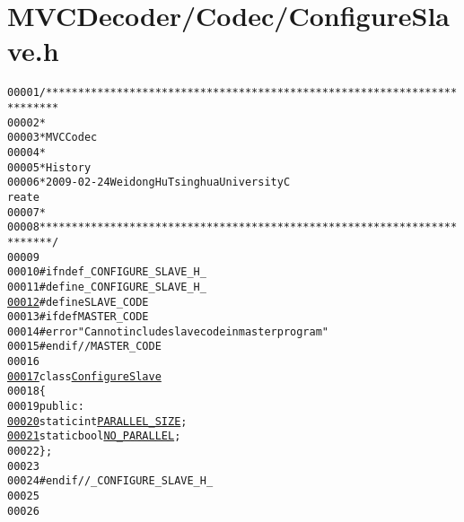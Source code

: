 \hypertarget{_configure_slave_8h_source}{
\section{MVCDecoder/Codec/ConfigureSlave.h}
}


\begin{footnotesize}\begin{alltt}
00001 \textcolor{comment}{/************************************************************************}
00002 \textcolor{comment}{ *}
00003 \textcolor{comment}{ * MVC Codec}
00004 \textcolor{comment}{ * }
00005 \textcolor{comment}{ * History}
00006 \textcolor{comment}{ * 2009-02-24           Weidong Hu              Tsinghua University             C
      reate}
00007 \textcolor{comment}{ * }
00008 \textcolor{comment}{ ************************************************************************/}
00009 
00010 \textcolor{preprocessor}{#ifndef \_CONFIGURE\_SLAVE\_H\_}
00011 \textcolor{preprocessor}{}\textcolor{preprocessor}{#define \_CONFIGURE\_SLAVE\_H\_}
\hypertarget{_configure_slave_8h_source_l00012}{}\hyperlink{_configure_slave_8h_a995f6a4907273b8d56b6543ab1a57d17}{00012} \textcolor{preprocessor}{}\textcolor{preprocessor}{#define SLAVE\_CODE}
00013 \textcolor{preprocessor}{}\textcolor{preprocessor}{#ifdef MASTER\_CODE}
00014 \textcolor{preprocessor}{}\textcolor{preprocessor}{#error "Can not include slave code in master program"}
00015 \textcolor{preprocessor}{}\textcolor{preprocessor}{#endif // MASTER\_CODE}
00016 \textcolor{preprocessor}{}
\hypertarget{_configure_slave_8h_source_l00017}{}\hyperlink{class_configure_slave}{00017} \textcolor{keyword}{class }\hyperlink{class_configure_slave}{ConfigureSlave}
00018 \{
00019 \textcolor{keyword}{public}:
\hypertarget{_configure_slave_8h_source_l00020}{}\hyperlink{class_configure_slave_aa79549b1785cff1588646653021641f2}{00020}         \textcolor{keyword}{static} \textcolor{keywordtype}{int} \hyperlink{class_configure_slave_aa79549b1785cff1588646653021641f2}{PARALLEL_SIZE};
\hypertarget{_configure_slave_8h_source_l00021}{}\hyperlink{class_configure_slave_a51c09eff937ca8da9bcc20e1367ddb3d}{00021}         \textcolor{keyword}{static} \textcolor{keywordtype}{bool} \hyperlink{class_configure_slave_a51c09eff937ca8da9bcc20e1367ddb3d}{NO_PARALLEL};
00022 \};
00023 
00024 \textcolor{preprocessor}{#endif //\_CONFIGURE\_SLAVE\_H\_}
00025 \textcolor{preprocessor}{}
00026 
\end{alltt}\end{footnotesize}
